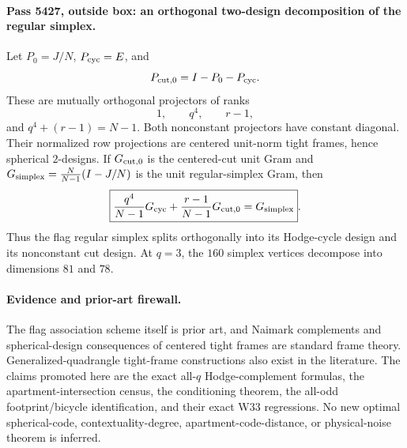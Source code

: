 \paragraph{Pass 5427, outside box: an orthogonal two-design decomposition of the regular simplex.}
Let $P_0=J/N$, $P_{\rm cyc}=E$, and
\[
 P_{\rm cut,0}=I-P_0-P_{\rm cyc}.
\]
These are mutually orthogonal projectors of ranks
\[
 1,\qquad q^4,\qquad r-1,
\]
and $q^4+(r-1)=N-1$.  Both nonconstant projectors have constant diagonal.  Their normalized row projections are centered unit-norm tight frames, hence spherical $2$-designs.  If $G_{\rm cut,0}$ is the centered-cut unit Gram and $G_{\rm simplex}=\frac{N}{N-1}(I-J/N)$ is the unit regular-simplex Gram, then
\[
 \boxed{\frac{q^4}{N-1}G_{\rm cyc}+\frac{r-1}{N-1}G_{\rm cut,0}=G_{\rm simplex}}.
\]
Thus the flag regular simplex splits orthogonally into its Hodge-cycle design and its nonconstant cut design.  At $q=3$, the $160$ simplex vertices decompose into dimensions $81$ and $78$.

\paragraph{Evidence and prior-art firewall.}
The flag association scheme itself is prior art, and Naimark complements and spherical-design consequences of centered tight frames are standard frame theory.  Generalized-quadrangle tight-frame constructions also exist in the literature.  The claims promoted here are the exact all-$q$ Hodge-complement formulas, the apartment-intersection census, the conditioning theorem, the all-odd footprint/bicycle identification, and their exact W33 regressions.  No new optimal spherical-code, contextuality-degree, apartment-code-distance, or physical-noise theorem is inferred.
\fi
